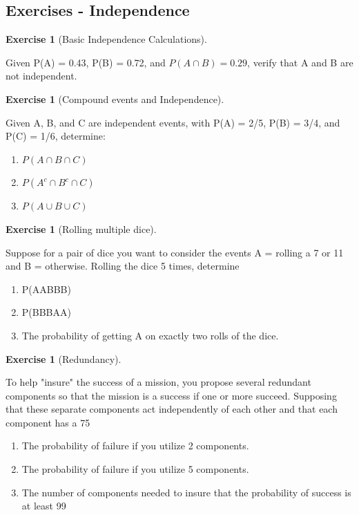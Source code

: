 \documentclass[10pt,]{book}
\theoremstyle{plain}
\theoremstyle{definition}
\theoremstyle{definition}
\theoremstyle{definition}
\newtheorem{exercise}[theorem]{Exercise}
\numberwithin{equation}{section}
\begin{document}
\subsection[{Exercises - Independence}]{Exercises - Independence}\label{subsection-5}
\begin{exercise}[{Basic Independence Calculations}]\label{exercise-35}

	Given P(A) = 0.43, P(B) = 0.72, and \(P(A \cap B) = 0.29\), verify that A and B are not independent.
\end{exercise}
\begin{exercise}[{Compound events and Independence}]\label{exercise-36}

	Given A, B, and C are independent events, with P(A) = 2/5, P(B) = 3/4, and P(C) = 1/6, determine:
	\leavevmode%
\begin{enumerate}
\item\hypertarget{li-175}{}\(P(A \cap B \cap C)\)%
\item\hypertarget{li-176}{}\(P(A^c \cap B^c \cap C)\)%
\item\hypertarget{li-177}{}\(P(A \cup B \cup C)\)%
\end{enumerate}

\end{exercise}
\begin{exercise}[{Rolling multiple dice}]\label{exercise-37}

	Suppose for a pair of dice you want to consider the events A = {rolling a 7 or 11} and B = {otherwise}.  Rolling the dice 5 times, determine
	\leavevmode%
\begin{enumerate}
\item\hypertarget{li-178}{}P(AABBB)%
\item\hypertarget{li-179}{}P(BBBAA)%
\item\hypertarget{li-180}{}The probability of getting A on exactly two rolls of the dice.%
\end{enumerate}

\end{exercise}
\begin{exercise}[{Redundancy}]\label{exercise-38}

	To help "insure" the success of a mission, you propose several redundant components so that the mission is a success if one or more succeed. Supposing that these separate components act independently of each other and that each component has a 75%
	\leavevmode%
\begin{enumerate}
\item\hypertarget{li-181}{}The probability of failure if you utilize 2 components.%
\item\hypertarget{li-182}{}The probability of failure if you utilize 5 components.%
\item\hypertarget{li-183}{}The number of components needed to insure that the probability of success is at least 99%
\end{enumerate}

\end{exercise}
\end{document}
